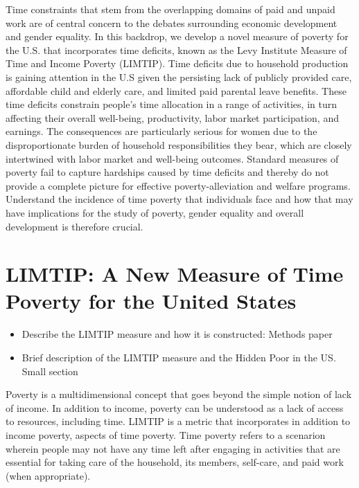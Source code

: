 \documentclass[
  11pt,
]{article}
\providecommand{\tightlist}{%
  \setlength{\itemsep}{0pt}\setlength{\parskip}{0pt}}\usepackage{longtable,booktabs,array}
\begin{document}
Time constraints that stem from the overlapping domains of paid and
unpaid work are of central concern to the debates surrounding economic
development and gender equality. In this backdrop, we develop a novel
measure of poverty for the U.S. that incorporates time deficits, known
as the Levy Institute Measure of Time and Income Poverty (LIMTIP). Time
deficits due to household production is gaining attention in the U.S
given the persisting lack of publicly provided care, affordable child
and elderly care, and limited paid parental leave benefits. These time
deficits constrain people's time allocation in a range of activities, in
turn affecting their overall well-being, productivity, labor market
participation, and earnings. The consequences are particularly serious
for women due to the disproportionate burden of household
responsibilities they bear, which are closely intertwined with labor
market and well-being outcomes. Standard measures of poverty fail to
capture hardships caused by time deficits and thereby do not provide a
complete picture for effective poverty-alleviation and welfare programs.
Understand the incidence of time poverty that individuals face and how
that may have implications for the study of poverty, gender equality and
overall development is therefore crucial.

\section{LIMTIP: A New Measure of Time Poverty for the United
States}\label{limtip-a-new-measure-of-time-poverty-for-the-united-states}

\begin{itemize}
\tightlist
\item
  Describe the LIMTIP measure and how it is constructed: Methods paper
\item
  Brief description of the LIMTIP measure and the Hidden Poor in the US.
  Small section
\end{itemize}

Poverty is a multidimensional concept that goes beyond the simple notion
of lack of income. In addition to income, poverty can be understood as a
lack of access to resources, including time. LIMTIP is a metric that
incorporates in addition to income poverty, aspects of time poverty.
Time poverty refers to a scenarion wherein people may not have any time
left after engaging in activities that are essential for taking care of
the household, its members, self-care, and paid work (when appropriate).
\end{document}
